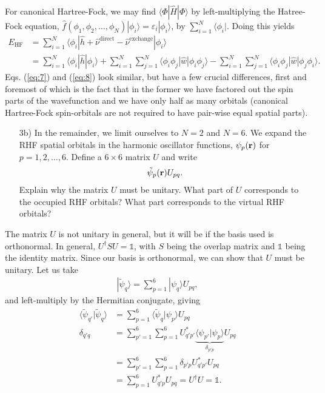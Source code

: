 \documentclass[a4paper]{article}
\newcommand{\nn}{\nonumber}
\begin{document}
For canonical Hartree-Fock, we may find $\langle \Phi | \hat{H} | \Phi\rangle$ by left-multiplying the Hatree-Fock equation, $\hat{f}(\phi_1,\phi_2,\dots,\phi_N)|\phi_i\rangle = \varepsilon_i |\phi_i\rangle$, by $\sum_{i=1}^N\langle \phi_i|$. Doing this yields 
\begin{align}
E_\text{HF} &= \sum_{i=1}^N\langle \phi_i|\hat{h}+\hat{\nu}^\text{direct} - \hat{\nu}^\text{exchange}|\phi_i\rangle \nn\\
&= \sum_{i=1}^N\langle \phi_i|\hat{h}|\phi_i\rangle + \sum_{i=1}^N\sum_{j=1}^N\langle \phi_i\phi_j|\hat{w}|\phi_i\phi_j\rangle - \sum_{i=1}^N\sum_{j=1}^N\langle \phi_i\phi_j|\hat{w}|\phi_j\phi_i\rangle. \label{eq:8}
\end{align}
Eqs. (\ref{eq:7}) and (\ref{eq:8}) look similar, but have a few crucial differences, first and foremost of which is the fact that in the former we have factored out the spin parts of the wavefunction and we have only half as many orbitals (canonical Hartree-Fock spin-orbitals are not required to have pair-wise equal spatial parts).

\begin{exframe}
\begin{itemize}
  \item[3b)] In the remainder, we limit ourselves to $N=2$ and $N=6$. We expand the RHF spatial orbitals in the harmonic oscillator functions, $\psi_p({\bf r})$ for $p=1,2,\dots,6$. Define a $6\times6$ matrix $U$ and write
  \begin{align}
  \tilde{\psi}_p({\bf r})U_{pq}. \label{eq:9}
  \end{align}
  Explain why the matrix $U$ must be unitary. What part of $U$ corresponds to the occupied RHF orbitals? What part corresponds to the virtual RHF orbitals?
\end{itemize}
\end{exframe}
The matrix $U$ is not unitary in general, but it will be if the basis used is orthonormal. In general, $U^\dagger S U = \mathbb{1}$, with $S$ being the overlap matrix and $\mathbb{1}$ being the identity matrix. Since our basis is orthonormal, we can show that $U$ must be unitary. Let us take 
\begin{align}
|\tilde{\psi}_q\rangle = \sum_{p=1}^6 |{\psi}_q\rangle U_{pq},
\end{align}
and left-multiply by the Hermitian conjugate, giving
\begin{align}
\langle \tilde{\psi}_{q'}|\tilde{\psi}_q\rangle &= \sum_{p=1}^6 \langle\tilde{\psi}_{q}|{\psi}_p\rangle U_{pq} \nn\\
\delta_{q'q} &=\sum_{p'=1}^6\sum_{p=1}^6 U^*_{q'p'}\underbrace{\langle\psi_{p'}|{\psi}_p\rangle}_{\delta_{p'p}} U_{pq} \nn\\
 &= \sum_{p'=1}^6\sum_{p=1}^6 \delta_{p'p} U^*_{q'p'} U_{pq} \nn\\
 &= \sum_{p=1}^6 U^*_{q'p}U_{pq} = U^\dagger U = \mathbb{1}.
\end{align}
\end{document}
